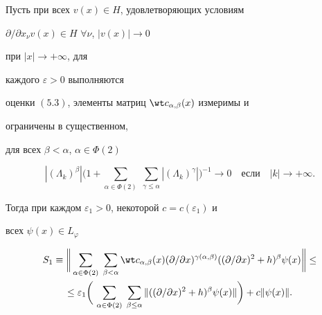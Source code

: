 \begin{lems} 


Пусть при всех $v(x)\in H$, удовлетворяющих условиям


$\partial/\partial x_\nu v(x)\in H$ $\forall\nu$, $|v(x)|\to 0$


при $|x|\to +\infty$, для 


каждого $\varepsilon>0$ выполняются  


оценки $(5.3)$, элементы матриц $\wt c_{\alpha,\beta}(x)$ измеримы и 


ограничены в существенном, 


для всех $\beta<\alpha$, $\alpha\in\Phi(2)$ 


\begin{equation} 


|(\Lambda_k)^\beta|\bigg(1+\sum_{\alpha\in\Phi(2)}\; 


\sum_{\gamma\le\alpha}|(\Lambda_k)^\gamma|\bigg)^{-1}\to 0 


\quad 


\text{если}\quad |k|\to+\infty. 


\end{equation} 


Тогда при каждом $\varepsilon_1>0$, некоторой $c=c(\varepsilon_1)$ и 


всех $\psi(x)\in L_\varphi$ 


\begin{multline} 


S_1\equiv\bigg\|\sum_{\alpha\in\Phi(2)}\; 


\sum_{\beta<\alpha}\wt c_{\alpha,\beta}(x)


(\partial/\partial x)^{\gamma(\alpha,\beta)} 


((\partial/\partial x)^2+h)^\beta\psi(x)\bigg\|\le \\ 


\le \varepsilon_1\bigg(\,\sum_{\alpha\in\Phi(2)}\; 


\sum_{\beta\le\alpha}\|((\partial/\partial x)^2+h)^\beta 


\psi(x)\|\bigg)+c\|\psi(x)\|. 


\end{multline} 


\end{lems} 


 


